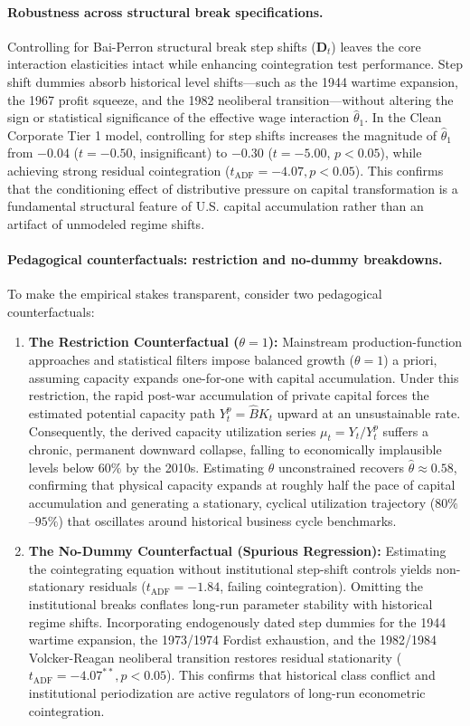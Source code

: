 \paragraph{Robustness across structural break specifications.}
Controlling for Bai-Perron structural break step shifts ($\mathbf{D}_t$) leaves the core interaction elasticities intact while enhancing cointegration test performance. Step shift dummies absorb historical level shifts---such as the 1944 wartime expansion, the 1967 profit squeeze, and the 1982 neoliberal transition---without altering the sign or statistical significance of the effective wage interaction $\hat{\theta}_1$. In the Clean Corporate Tier 1 model, controlling for step shifts increases the magnitude of $\hat{\theta}_1$ from $-0.04$ ($t = -0.50$, insignificant) to $-0.30$ ($t = -5.00$, $p < 0.05$), while achieving strong residual cointegration ($t_{\text{ADF}} = -4.07, p < 0.05$). This confirms that the conditioning effect of distributive pressure on capital transformation is a fundamental structural feature of U.S. capital accumulation rather than an artifact of unmodeled regime shifts.

\paragraph{Pedagogical counterfactuals: restriction and no-dummy breakdowns.}
To make the empirical stakes transparent, consider two pedagogical counterfactuals:
\begin{enumerate}
	\item \textbf{The Restriction Counterfactual ($\theta = 1$):} Mainstream production-function approaches and statistical filters impose balanced growth ($\theta = 1$) a priori, assuming capacity expands one-for-one with capital accumulation. Under this restriction, the rapid post-war accumulation of private capital forces the estimated potential capacity path $Y^p_t = \hat{B} K_t$ upward at an unsustainable rate. Consequently, the derived capacity utilization series $\mu_t = Y_t / Y^p_t$ suffers a chronic, permanent downward collapse, falling to economically implausible levels below $60\%$ by the 2010s. Estimating $\theta$ unconstrained recovers $\hat{\theta} \approx 0.58$, confirming that physical capacity expands at roughly half the pace of capital accumulation and generating a stationary, cyclical utilization trajectory ($80\%$--$95\%$) that oscillates around historical business cycle benchmarks.
	\item \textbf{The No-Dummy Counterfactual (Spurious Regression):} Estimating the cointegrating equation without institutional step-shift controls yields non-stationary residuals ($t_{\text{ADF}} = -1.84$, failing cointegration). Omitting the institutional breaks conflates long-run parameter stability with historical regime shifts. Incorporating endogenously dated step dummies for the 1944 wartime expansion, the 1973/1974 Fordist exhaustion, and the 1982/1984 Volcker-Reagan neoliberal transition restores residual stationarity ($t_{\text{ADF}} = -4.07^{**}, p < 0.05$). This confirms that historical class conflict and institutional periodization are active regulators of long-run econometric cointegration.
\end{enumerate}

